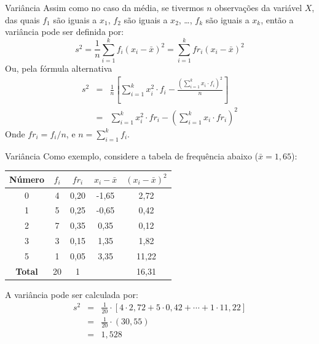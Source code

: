 \documentclass[10pt]{beamer}\usepackage[]{graphicx}\usepackage[]{color}
\theoremstyle{definition}
\begin{document}
\begin{frame}{Variância}
  Assim como no caso da média, se tivermos $n$ observações da variável
  $X$, das quais $f_1$ são iguais a $x_1$, $f_2$ são iguais a $x_2$,
  \ldots, $f_k$ são iguais a $x_k$, então a variância pode ser definida
  por:
  \begin{equation*}
    s^2 = \frac{1}{n} \sum_{i=1}^{k} f_i (x_i - \bar{x})^2 =
    \sum_{i=1}^{k} fr_i (x_i - \bar{x})^2
  \end{equation*}
  Ou, pela fórmula alternativa
  \begin{eqnarray*}
    s^2 &=& \frac{1}{n} \left[ \sum_{i=1}^{k} x_{i}^{2} \cdot f_i -
    \frac{(\sum_{i=1}^{k} x_i \cdot f_i)^2}{n} \right] \\
        &=& \sum_{i=1}^{k} x_{i}^{2} \cdot fr_i -
            \left( \sum_{i=1}^{k} x_i \cdot fr_i \right)^2
  \end{eqnarray*}
  Onde $fr_i = f_i/n$, e $n = \sum_{i=1}^{k} f_i$.
\end{frame}

\begin{frame}{Variância}
  Como exemplo, considere a tabela de frequência abaixo ($\bar{x} =
  1,65$):
  \begin{table}[h]
    \centering
    \begin{tabular}{ccccc}
      \hline
      \textbf{Número} & \textbf{$f_i$} & \textbf{$fr_i$}
      & \textbf{$x_i - \bar{x}$} & \textbf{$(x_i - \bar{x})^2$} \\
      \hline
      0 & 4 & 0,20 & -1,65 & 2,72 \\
      1 & 5 & 0,25 & -0,65 & 0,42 \\
      2 & 7 & 0,35 & 0,35 & 0,12 \\
      3 & 3 & 0,15 & 1,35 & 1,82 \\
      5 & 1 & 0,05 & 3,35 & 11,22 \\
      \hline
      \textbf{Total} & 20 & 1 & & 16,31 \\
      \hline
    \end{tabular}
  \end{table}
  A variância pode ser calculada por:
  \begin{eqnarray*}
    s^2 &=& \frac{1}{20} \cdot [4 \cdot 2,72 + 5 \cdot 0,42 + \cdots + 1 \cdot 11,22]\\
            &=& \frac{1}{20} \cdot (30,55)\\
            &=& 1,528
  \end{eqnarray*}
\end{frame}
\end{document}

